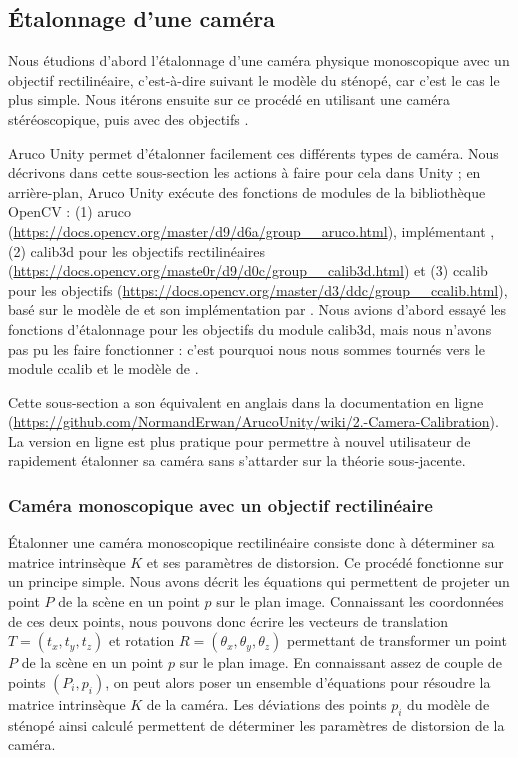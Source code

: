 \subsection{Étalonnage d'une caméra}
Nous étudions d'abord l'étalonnage d'une caméra physique monoscopique avec un objectif rectilinéaire, c'est-à-dire suivant le modèle du sténopé, car c'est le cas le plus simple. Nous itérons ensuite sur ce procédé en utilisant une caméra stéréoscopique, puis avec des objectifs .

Aruco Unity permet d'étalonner facilement ces différents types de caméra. Nous décrivons dans cette sous-section les actions à faire pour cela dans Unity ; en arrière-plan, Aruco Unity exécute des fonctions de modules de la bibliothèque OpenCV : (1) aruco (\url{https://docs.opencv.org/master/d9/d6a/group__aruco.html}), implémentant \cite{Garrido-Jurado2014}, (2) calib3d pour les objectifs rectilinéaires (\url{https://docs.opencv.org/maste0r/d9/d0c/group__calib3d.html}) et (3) ccalib pour les objectifs  (\url{https://docs.opencv.org/master/d3/ddc/group__ccalib.html}), basé sur le modèle de \cite{Mei2007} et son implémentation par \cite{Li2013}. Nous avions d'abord essayé les fonctions d'étalonnage pour les objectifs  du module calib3d, mais nous n'avons pas pu les faire fonctionner : c'est pourquoi nous nous sommes tournés vers le module ccalib et le modèle de \cite{Mei2007}.

Cette sous-section a son équivalent en anglais dans la documentation en ligne (\url{https://github.com/NormandErwan/ArucoUnity/wiki/2.-Camera-Calibration}). La version en ligne est plus pratique pour permettre à nouvel utilisateur de rapidement étalonner sa caméra sans s'attarder sur la théorie sous-jacente.

\subsubsection{Caméra monoscopique avec un objectif rectilinéaire}
Étalonner une caméra monoscopique rectilinéaire consiste donc à déterminer sa matrice intrinsèque $K$ et ses paramètres de distorsion. Ce procédé fonctionne sur un principe simple. Nous avons décrit les équations qui permettent de projeter un point $P$ de la scène en un point $p$ sur le plan image. Connaissant les coordonnées de ces deux points, nous pouvons donc écrire les vecteurs de translation $T = (t_x, t_y, t_z)$ et rotation $R = (\theta_x, \theta_y, \theta_z)$ permettant de transformer un point $P$ de la scène en un point $p$ sur le plan image. En connaissant assez de couple de points $(P_i, p_i)$, on peut alors poser un ensemble d'équations pour résoudre la matrice intrinsèque $K$ de la caméra. Les déviations des points $p_i$ du modèle de sténopé ainsi calculé permettent de déterminer les paramètres de distorsion de la caméra.

